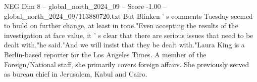 \begin{textsample}{NEG Dim 8 – global\_north\_2024\_09 – Score -1.00 – global\_north\_2024\_09/113880720.txt}
But Blinken ' s comments Tuesday seemed to build on further change, at least in tone."Even accepting the results of the investigation at face value, it ' s clear that there are serious issues that need to be dealt with,"he said."And we will insist that they be dealt with."Laura King is a Berlin-based reporter for the Los Angeles Times.
A member of the Foreign/National staff, she primarily covers foreign affairs.
She previously served as bureau chief in Jerusalem, Kabul and Cairo.

\end{textsample}
